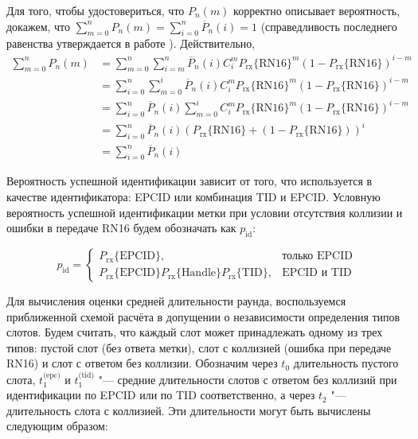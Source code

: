 Для того, чтобы удостовериться, что $P_n(m)$ корректно описывает вероятность, докажем, что $\sum\limits_{m = 0}^n P_n(m) = \sum\limits_{i=0}^n \overline{P}_n(i) = 1$ (справедливость последнего равенства утверждается в работе \cite{Vales-Alonso2011}). Действительно,
$$
\begin{aligned}
	\sum\limits_{m=0}^n P_n(m) &=
		\sum\limits_{m=0}^n \sum\limits_{i=m}^n \overline{P}_n(i) C_i^m
			P_\text{rx}\{\text{RN16}\}^m (1 - P_\text{rx}\{\text{RN16}\})^{i-m}\\
	&= \sum\limits_{i=0}^n \sum\limits_{m=0}^i \overline{P}_n(i) C_i^m
			P_\text{rx}\{\text{RN16}\}^m (1 - P_\text{rx}\{\text{RN16}\})^{i-m}\\
	&= \sum\limits_{i=0}^n \overline{P}_n(i) \sum\limits_{m=0}^i C_i^m
			P_\text{rx}\{\text{RN16}\}^m (1 - P_\text{rx}\{\text{RN16}\})^{i-m}\\
	&= \sum\limits_{i=0}^n \overline{P}_n(i) \left( P_\text{rx}\{\text{RN16}\} + (1 - P_\text{rx}\{\text{RN16}\}) \right)^i\\
	&= \sum\limits_{i=0}^n \overline{P}_n(i)
\end{aligned}
$$

Вероятность успешной идентификации зависит от того, что используется в качестве идентификатора: EPCID или комбинация TID и EPCID. Условную вероятность успешной идентификации метки при условии отсутствия коллизии и ошибки в передаче RN16 будем обозначать как $p_{\text{id}}$:

\begin{equation}\label{eq:ch3_p_id}
	p_{\text{id}} = \begin{cases}
		P_{\text{rx}}\{\text{EPCID}\}, &\text{только EPCID}\\
		P_{\text{rx}}\{\text{EPCID}\}P_{\text{rx}}\{\text{Handle}\}P_{\text{rx}}\{\text{TID}\},&\text{EPCID и TID}
	\end{cases}
\end{equation}

Для вычисления оценки средней длительности раунда, воспользуемся приближенной схемой расчёта в допущении о независимости определения типов слотов. Будем считать, что каждый слот может принадлежать одному из трех типов: пустой слот (без ответа метки), слот с коллизией (ошибка при передаче RN16) и слот с ответом без коллизии. Обозначим через $t_0$ длительность пустого слота, $t_1^{\text{(epc)}}$ и $t_1^{\text{(tid)}}$  "--- средние длительности слотов с ответом без коллизий при идентификации по EPCID или по TID соответственно, а через $t_2$ "--- длительность слота с коллизией. Эти длительности могут быть вычислены следующим образом:

